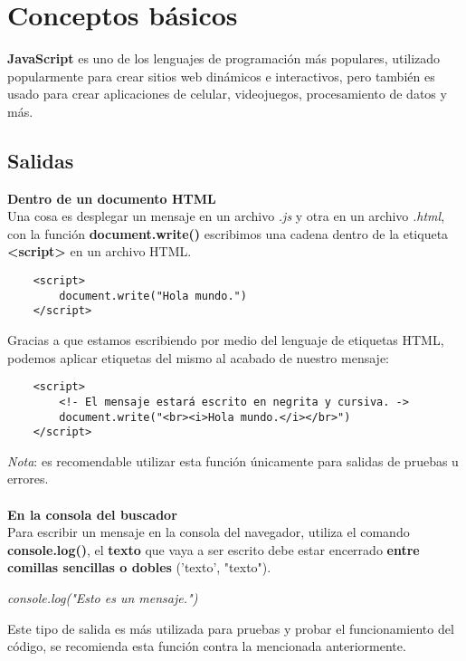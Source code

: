 \section{Conceptos básicos}
\hspace{0.55cm}\textbf{JavaScript} es uno de los lenguajes de programación más populares, utilizado popularmente para crear sitios web dinámicos e interactivos, pero también es usado para crear aplicaciones de celular, videojuegos, procesamiento de datos y más.


\subsection{Salidas}

\textbf{Dentro de un documento HTML}\\

Una cosa es desplegar un mensaje en un archivo \textit{.js} y otra en un archivo \textit{.html}, con la función \textbf{document.write()} escribimos una cadena dentro de la etiqueta \textbf{<script>} en un archivo HTML.
\begin{lstlisting}
    <script>
        document.write("Hola mundo.")
    </script>
\end{lstlisting}

Gracias a que estamos escribiendo por medio del lenguaje de etiquetas HTML, podemos aplicar etiquetas del mismo al acabado de nuestro mensaje:
\begin{lstlisting}
    <script>
        <!- El mensaje estará escrito en negrita y cursiva. ->
        document.write("<br><i>Hola mundo.</i></br>")
    </script>
\end{lstlisting}

\textit{Nota}: es recomendable utilizar esta función únicamente para salidas de pruebas u errores.\\
\\\textbf{En la consola del buscador}\\

Para escribir un mensaje en la consola del navegador, utiliza el comando \textbf{console.log()}, el \textbf{texto} que vaya a ser escrito debe estar encerrado \textbf{entre comillas sencillas o dobles} ('texto', "texto").
\begin{center}
    \textit{console.log("Esto es un mensaje.")}
\end{center}

Este tipo de salida es más utilizada para pruebas y probar el funcionamiento del código, se recomienda esta función contra la mencionada anteriormente.



